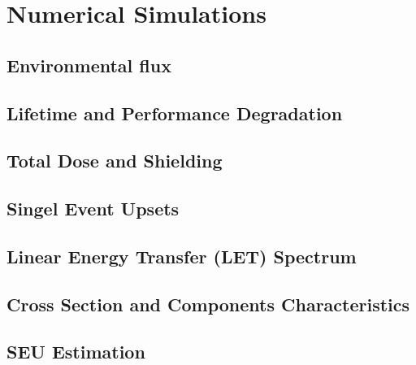 \section{Numerical Simulations}

\subsection{Environmental flux}

\subsection{Lifetime and Performance Degradation}

\subsection{Total Dose and Shielding}

\subsection{Singel Event Upsets}

\subsection{Linear Energy Transfer (LET) Spectrum}

\subsection{Cross Section and Components Characteristics}

\subsection{SEU Estimation}
